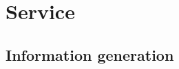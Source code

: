 \documentclass{book}
\begin{document}
%
%
%
%
%
%
%
%





\chapter{Service}
\label{cha:service}

\section{Information generation}
\label{sec:service_information_generation}
\end{document}
